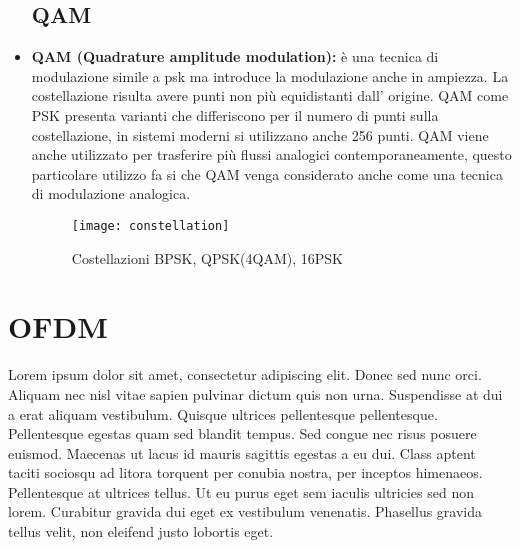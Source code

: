 \begin{itemize}
	\subsection{QAM}
  \item \textbf{QAM (Quadrature amplitude modulation): } è una tecnica di modulazione simile a psk ma introduce la modulazione anche in ampiezza. La costellazione risulta avere punti non più equidistanti dall' origine. QAM come PSK presenta varianti che differiscono per il numero di punti sulla costellazione, in sistemi moderni si utilizzano anche 256 punti. QAM viene anche utilizzato per trasferire più flussi analogici contemporaneamente, questo particolare utilizzo fa si che QAM venga considerato anche come una tecnica di modulazione analogica. 
  \cite{qam}
  
  \begin{figure}[h]
	\centering
	\texttt{[image: constellation]}
	\caption{Costellazioni BPSK, QPSK(4QAM), 16PSK \cite{psk-constellation}}\label{fig:1}
  \end{figure} 
  \end{itemize}


\section{OFDM}
\label{sec:problem}

Lorem ipsum dolor sit amet, consectetur adipiscing elit. Donec sed nunc orci. Aliquam nec nisl vitae sapien pulvinar dictum quis non urna. Suspendisse at dui a erat aliquam vestibulum. Quisque ultrices pellentesque pellentesque. Pellentesque egestas quam sed blandit tempus. Sed congue nec risus posuere euismod. Maecenas ut lacus id mauris sagittis egestas a eu dui. Class aptent taciti sociosqu ad litora torquent per conubia nostra, per inceptos himenaeos. Pellentesque at ultrices tellus. Ut eu purus eget sem iaculis ultricies sed non lorem. Curabitur gravida dui eget ex vestibulum venenatis. Phasellus gravida tellus velit, non eleifend justo lobortis eget.


